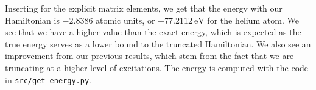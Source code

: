 

Inserting for the explicit matrix elements, we get that the energy with our Hamiltonian is $-2.8386$ atomic units, or $-77.2112 \ \text{eV}$ for the helium atom.
We see that we have a higher value than the exact energy, which is expected as the true energy serves as a lower bound to the truncated Hamiltonian.
We also see an improvement from our previous results, which stem from the fact that we are truncating at a higher level of excitations.
The energy is computed with the code in \verb|src/get_energy.py|.
